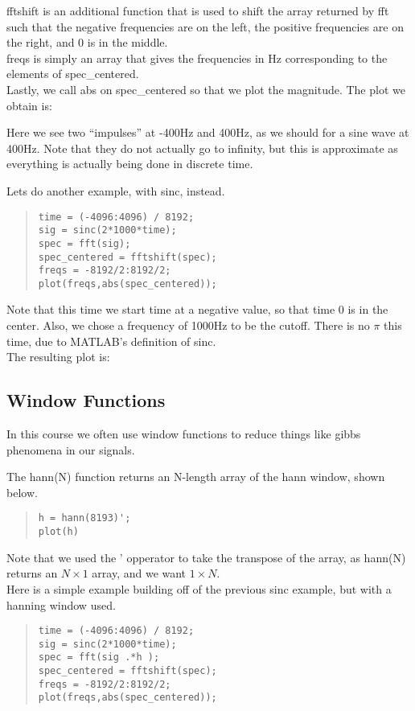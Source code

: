 \documentclass[11pt]{article}
\def\sc{\begin{quote}\begin{lstlisting}}
\def\tt#1{{\ttfamily #1}}
\begin{document}
\tt{fftshift} is an additional function that is used to shift the array returned by \tt{fft} such that the negative frequencies are on the left, the positive frequencies are on the right, and 0 is in the middle. \\

\tt{freqs} is simply an array that gives the frequencies in Hz corresponding to the elements of \tt{spec\_centered}. \\

Lastly, we call \tt{abs} on \tt{spec\_centered} so that we plot the magnitude. The plot we obtain is:


Here we see two ``impulses'' at -400Hz and 400Hz, as we should for a sine wave at 400Hz. Note that they do not actually go to infinity, but this is approximate as everything is actually being done in discrete time.

Lets do another example, with sinc, instead.

\sc
time = (-4096:4096) / 8192;
sig = sinc(2*1000*time);
spec = fft(sig);
spec_centered = fftshift(spec);
freqs = -8192/2:8192/2;
plot(freqs,abs(spec_centered));
\end{lstlisting}
\end{quote}

Note that this time we start \tt{time} at a negative value, so that time 0 is in the center. Also, we chose a frequency of 1000Hz to be the cutoff. There is no $\pi$ this time, due to MATLAB's definition of sinc.\\

The resulting plot is: 


\subsection{Window Functions}

In this course we often use window functions to reduce things like gibbs phenomena in our signals.

The \tt{hann(N)} function returns an \tt{N}-length array of the hann window, shown below.

\sc
h = hann(8193)';
plot(h)
\end{lstlisting}
\end{quote}


Note that we used the \tt{'} opperator to take the transpose of the array, as \tt{hann(N)} returns an $N \times 1$ array, and we want $1 \times N$.\\

Here is a simple example building off of the previous sinc example, but with a hanning window used.

\sc
time = (-4096:4096) / 8192;
sig = sinc(2*1000*time);
spec = fft(sig .*h );
spec_centered = fftshift(spec);
freqs = -8192/2:8192/2;
plot(freqs,abs(spec_centered));
\end{lstlisting}
\end{quote}

\end{document}

